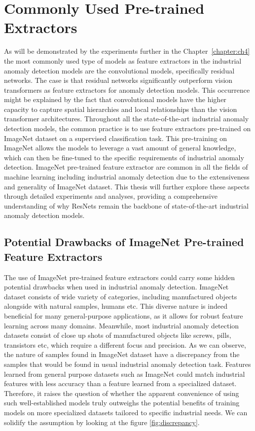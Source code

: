 \section{Commonly Used Pre-trained Extractors}
As will be demonstrated by the experiments further in the Chapter~\ref{chapter:ch4} the most commonly used type of models as feature extractors in the industrial anomaly detection models are the convolutional models, specifically residual networks. The case is that residual networks significantly outperform vision transformers as feature extractors for anomaly detection models. This occurrence might be explained by the fact that convolutional models have the higher capacity to capture spatial hierarchies and local relationships than the vision transformer architectures. Throughout all the state-of-the-art industrial anomaly detection models, the common practice is to use feature extractors pre-trained on ImageNet dataset on a supervised classification task. This pre-training on ImageNet allows the models to leverage a vast amount of general knowledge, which can then be fine-tuned to the specific requirements of industrial anomaly detection. ImageNet pre-trained feature extractor are common in all the fields of machine learning including industrial anomaly detection due to the extensiveness and generality of ImageNet dataset. This thesis will further explore these aspects through detailed experiments and analyses, providing a comprehensive understanding of why ResNets remain the backbone of state-of-the-art industrial anomaly detection models.

\subsection{Potential Drawbacks of ImageNet Pre-trained Feature Extractors}
The use of ImageNet pre-trained feature extractors could carry some hidden potential drawbacks when used in industrial anomaly detection. ImageNet dataset consists of wide variety of categories, including manufactured objects alongside with natural samples, humans etc. This diverse nature is indeed beneficial for many general-purpose applications, as it allows for robust feature learning across many domains. Meanwhile, most industrial anomaly detection datasets consist of close up shots of manufactured objects like screws, pills, transistors etc, which require a different focus and precision. As we can observe, the nature of samples found in ImageNet dataset have a discrepancy from the samples that would be found in usual industrial anomaly detection task. Features learned from general purpose datasets such as ImageNet could match industrial features with less accuracy than a feature learned from a specialized dataset. Therefore, it raises the question of whether the apparent convenience of using such well-established models truly outweighs the potential benefits of training models on more specialized datasets tailored to specific industrial needs. We can solidify the assumption by looking at the figure \ref{fig:discrepancy}.

